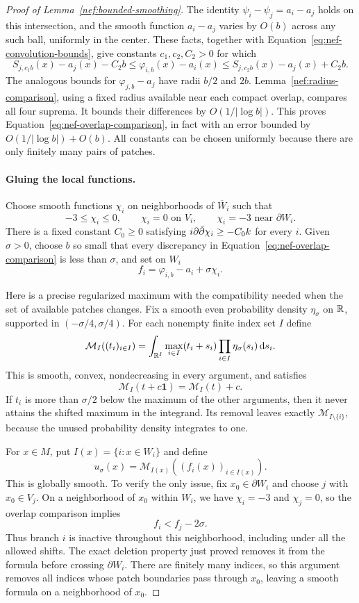 \begin{proof}[Proof of Lemma~\ref{nef:bounded-smoothing}]
The identity $\psi_i-\psi_j=a_i-a_j$ holds on this intersection,
and the smooth function $a_i-a_j$ varies by $O(b)$ across any such
ball, uniformly in the center.  These facts, together with
Equation~\eqref{eq:nef-convolution-bounds}, give constants
$c_1,c_2,C_2>0$ for which
\[
 S_{j,c_1b}(x)-a_j(x)-C_2b
 \leq\varphi_{i,b}(x)-a_i(x)
 \leq S_{j,c_2b}(x)-a_j(x)+C_2b.
\]
The analogous bounds for $\varphi_{j,b}-a_j$ have radii $b/2$
and $2b$.  Lemma~\ref{nef:radius-comparison}, using a fixed radius
available near each compact overlap, compares all four suprema.
It bounds their differences by $O(1/|\log b|)$.  This proves
Equation~\eqref{eq:nef-overlap-comparison}, in fact with an error
bounded by $O(1/|\log b|)+O(b)$.  All constants can be chosen
uniformly because there are only finitely many pairs of patches.

\paragraph{Gluing the local functions.}
Choose smooth functions $\chi_i$ on neighborhoods of $\overline W_i$
such that
\[
 -3\leq\chi_i\leq0,\qquad
 \chi_i=0\text{ on }V_i,\qquad
 \chi_i=-3\text{ near }\partial W_i.
\]
There is a fixed constant $C_0\geq0$ satisfying
$i\partial\bar\partial\chi_i\geq-C_0k$ for every $i$.  Given $\sigma>0$, choose
$b$ so small that every discrepancy in
Equation~\eqref{eq:nef-overlap-comparison} is less than $\sigma$,
and set on $W_i$
\[
 f_i=\varphi_{i,b}-a_i+\sigma\chi_i.
\]

Here is a precise regularized maximum with the compatibility needed
when the set of available patches changes.  Fix a smooth even
probability density $\eta_\sigma$ on $\mathbb R$, supported in
$(-\sigma/4,\sigma/4)$.  For each nonempty finite index set $I$
define
\[
 \mathcal M_I((t_i)_{i\in I})
 =\int_{\mathbb R^I}\max_{i\in I}(t_i+s_i)
       \prod_{i\in I}\eta_\sigma(s_i)\,\mathrm d s_i.
\]
This is smooth, convex, nondecreasing in every argument, and
satisfies
\begin{equation}
 \mathcal M_I(t+c\mathbf1)=\mathcal M_I(t)+c.
 \label{eq:nef-max-translation}
\end{equation}
If $t_i$ is more than $\sigma/2$ below the maximum of the other
arguments, then it never attains the shifted maximum in the
integrand.  Its removal leaves exactly $\mathcal M_{I\setminus\{i\}}$,
because the unused probability density integrates to one.

For $x\in M$, put $I(x)=\{i:x\in W_i\}$ and define
\[
 u_\sigma(x)=\mathcal M_{I(x)}((f_i(x))_{i\in I(x)}).
\]
This is globally smooth.  To verify the only issue, fix
$x_0\in\partial W_i$ and choose $j$ with $x_0\in V_j$.
On a neighborhood of $x_0$ within $W_i$, we have
$\chi_i=-3$ and $\chi_j=0$, so the overlap comparison implies
\[
 f_i<f_j-2\sigma.
\]
Thus branch $i$ is inactive throughout this neighborhood, including
under all the allowed shifts.  The exact deletion property just
proved removes it from the formula before crossing $\partial W_i$.
There are finitely many indices, so this argument removes all
indices whose patch boundaries pass through $x_0$, leaving a smooth
formula on a neighborhood of $x_0$.


\end{proof}

